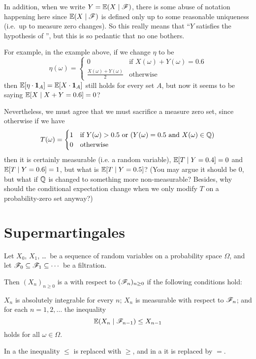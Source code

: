 \begin{abuse}
	In addition, when we write $Y = \mathbb E(X \mid \mathscr F)$,
	there is some abuse of notation happening here
	since $\mathbb E(X \mid \mathscr F)$ is defined only up to some reasonable uniqueness
	(i.e.\ up to measure zero changes).
	So this really means that
	``$Y$ satisfies the hypothesis of '',
	but this is so pedantic that no one bothers.

	For example, in the example above, if we change $\eta$ to be
	\[ \eta(\omega) =
		\begin{cases}
			0 & \text{if }X(\omega)+Y(\omega)=0.6 \\
			\frac{X(\omega)+Y(\omega)}{2} & \text{otherwise}
		\end{cases}
	\]
	then $\mathbb E[\eta \cdot \mathbf{1}_A] = \mathbb E[X \cdot \mathbf{1}_A]$ still holds for every set $A$,
	but now it seems to be saying $\mathbb E[X \mid X+Y=0.6] = 0$?

	Nevertheless, we must agree that we must sacrifice a measure zero set,
	since otherwise if we have
	\[ T(\omega) =
		\begin{cases}
			1&\text{if }Y(\omega) > 0.5\text{ or }(Y(\omega)=0.5\text{ and }X(\omega) \in \mathbb Q) \\
			0&\text{otherwise}
		\end{cases}
	\]
	then it is certainly measurable (i.e. a random variable),
	$\mathbb E[T \mid Y = 0.4] = 0$ and $\mathbb E[T \mid Y = 0.6] = 1$,
	but what is $\mathbb E[T \mid Y = 0.5]$?
	(You may argue it should be $0$, but what if $\mathbb Q$ is changed to something more non-measurable?
	Besides, why should the conditional expectation change when we only modify $T$
	on a probability-zero set anyway?)
\end{abuse}


\section{Supermartingales}

\begin{definition}
	Let $X_0$, $X_1$, \dots\ be a sequence of random variables
	on a probability space $\Omega$,
	and let $\mathscr F_0 \subseteq \mathscr F_1 \subseteq \cdots$ be a filtration.

	Then $(X_n)_{n \ge 0}$ is a 
	with respect to $(\mathscr F_n)_{n \ge 0}$ if the following conditions hold:
	\begin{itemize}
		\ii $X_n$ is absolutely integrable for every $n$;
		\ii $X_n$ is measurable with respect to $\mathscr F_n$; and
		\ii for each $n = 1, 2, \dots$ the inequality
		\[ \mathbb E(X_n \mid \mathscr F_{n-1}) \le X_{n-1} \]
		holds for all $\omega \in \Omega$.
	\end{itemize}

	In a  the inequality $\le$ is replaced with $\ge$,
	and in a  it is replaced by $=$.
\end{definition}

